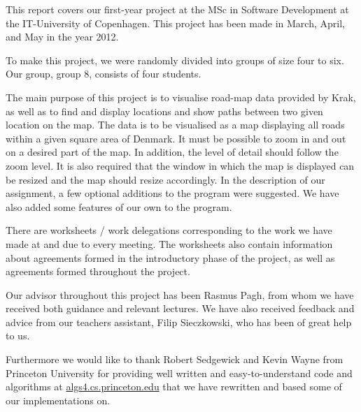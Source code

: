 This report covers our first-year project at the MSc in Software Development at the IT-University of Copenhagen. This project has been made in March, April, and May in the year 2012. 

To make this project, we were randomly divided into groups of size four to six. Our group, group 8, consists of four students. 

The main purpose of this project is to visualise road-map data provided by Krak, as well as to find and display locations and show paths between two given location on the map. The data is to be visualised as a map displaying all roads within a given square area of Denmark.
It must be possible to zoom in and out on a desired part of the map. In addition, the level of detail should follow the zoom level. It is also required that the window in which the map is displayed can be resized and the map should resize accordingly. In the description of our assignment, a few optional additions to the program were suggested. We have also added some features of our own to the program.

There are worksheets / work delegations corresponding to the work we have made at and due to every meeting. The worksheets also contain information about agreements formed in the introductory phase of the project, as well as agreements formed throughout the project.

Our advisor throughout this project has been Rasmus Pagh, from whom we have received both guidance and relevant lectures. We have also received feedback and advice from our teachers assistant, Filip Sieczkowski, who has been of great help to us.

Furthermore we would like to thank Robert Sedgewick and Kevin Wayne from Princeton University for providing well written and easy-to-understand code and algorithms at \url{algs4.cs.princeton.edu} that we have rewritten and based some of our implementations on.